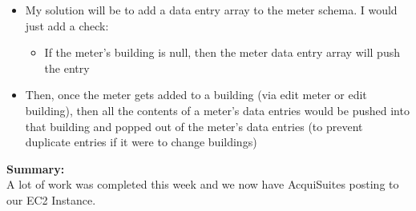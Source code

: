 \begin{adjustwidth}{2.5em}{0pt}
\begin{itemize}
	\item  My solution will be to add a data entry array to the meter schema. I would just add a check: 
	\begin{itemize}
		\item If the meter's building is null, then the meter data entry array will push the entry
	\end{itemize}
	\item Then, once the meter gets added to a building (via edit meter or edit building), then all the contents of a meter's data entries would be pushed into that building and popped out of the meter's data entries (to prevent duplicate entries if it were to change buildings) 
  \end{itemize}
  \vspace{-0.3cm}\noindent\textbf{Summary:}\\
    \noindent A lot of work was completed this week and we now have AcquiSuites posting to our EC2 Instance.
\end{adjustwidth} 
